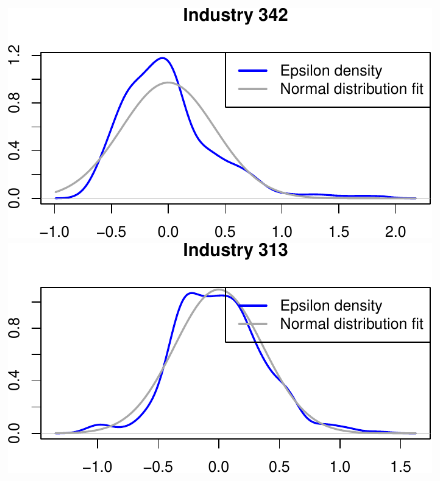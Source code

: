 \documentclass[
  12pt]{article}
\theoremstyle{definition}
\theoremstyle{remark}
\begin{document}
\begin{figure}
\begin{minipage}{\linewidth}
\includegraphics{Tax-Prod_files/figure-pdf/unnamed-chunk-59-4.pdf}

\includegraphics{Tax-Prod_files/figure-pdf/unnamed-chunk-59-5.pdf}

\end{minipage}%

\end{figure}%
\end{document}
